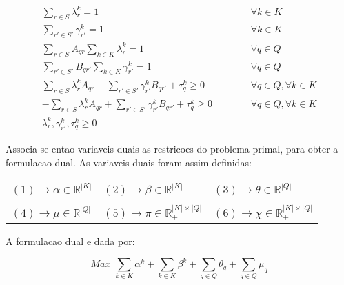 \documentclass[12pt]{article}
\begin{document}
\begin{eqnarray}
\label{eqB01}
  \sum\limits_{r \in S} {\lambda^k_r} = 1   & \hspace{1cm} & \forall k \in K \\
\label{eqB02}
  \sum\limits_{r' \in S'} {\gamma^k_{r'}} = 1 & \hspace{1cm} & \forall k \in K \\
\label{eqB03}
  \sum\limits_{r \in S} {A_{qr} \sum\limits_{k \in K}{\lambda^k_r}} = 1 & \hspace{1cm} & \forall q \in Q \\
\label{eqB04}
  \sum\limits_{r' \in S'} {B_{qr'} \sum\limits_{k \in K}{\gamma^k_{r'}}} = 1 & \hspace{1cm} & \forall q \in Q \\
\label{eqB05}
  \sum\limits_{r \in S} {\lambda^k_r A_{qr}} - \sum\limits_{r' \in S'} {\gamma^k_{r'} B_{qr'}} + \tau^k_q \ge 0 & \hspace{1cm} & \forall q \in Q, \forall k \in K \\
\label{eqB06}
  -\sum\limits_{r \in S} {\lambda^k_r A_{qr}} + \sum\limits_{r' \in S'} {\gamma^k_{r'} B_{qr'}} + \tau^k_q \ge 0 & \hspace{1cm} & \forall q \in Q, \forall k \in K \\
\label{eqB07}
  \lambda^k_r, \gamma^k_{r'}, \tau^k_q \ge 0
\end{eqnarray}


\newpage
Associa-se entao variaveis duais as restricoes do problema primal, para obter a formulacao dual. As variaveis duais foram assim definidas:
\begin{table}[!htb]
\begin{center}
\begin{tabular}{lll}
$(1) \rightarrow \alpha \in \mathbb{R}^{|K|}$ & $(2) \rightarrow \beta \in \mathbb{R}^{|K|}$ & $(3) \rightarrow \theta \in \mathbb{R}^{|Q|}$ \\
 & & \\
$(4) \rightarrow \mu \in \mathbb{R}^{|Q|}$ & $(5) \rightarrow \pi \in \mathbb{R}^{|K|\times|Q|}_+$ & $(6) \rightarrow \chi \in \mathbb{R}^{|K|\times|Q|}_+$ \\
\end{tabular}
\end{center}
\end{table}

\noindent A formulacao dual e dada por: \vspace{5mm}

\[
Max \,\, \sum\limits_{k \in K}{\alpha^k} + \sum\limits_{k \in K}{\beta^k} + \sum\limits_{q \in Q}{\theta_q} + \sum\limits_{q \in Q}{\mu_q}
\]
\end{document}
